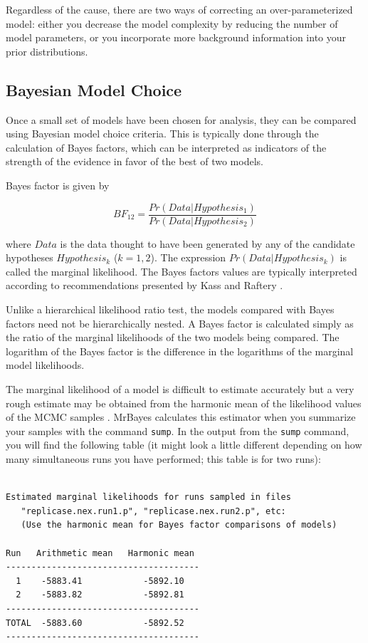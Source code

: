 \documentclass[12pt]{book}
\newcommand{\ttt}[1]{\texttt{#1}}
\begin{document}
Regardless of the cause, there are two ways of correcting an over-parameterized model: either you
decrease the model complexity by reducing the number of model parameters, or you incorporate more
background information into your prior distributions.

\subsection{Bayesian Model Choice}
Once a small set of models have been chosen for analysis, they can be compared using Bayesian model
choice criteria. This is typically done through the calculation of Bayes factors, which can be
interpreted as indicators of the strength of the evidence in favor of the best of two models.

Bayes factor is given by

$$
BF_{12} = \frac{Pr(Data|Hypothesis_{1})}{Pr(Data|Hypothesis_{2})}
$$

where $Data$ is the data thought to have been generated by any of the candidate hypotheses
$Hypothesis_{k}$ ($k = 1,2$). The expression $Pr(Data|Hypothesis_{k})$ is called the marginal
likelihood.  The Bayes factors values are typically interpreted according to recommendations
presented by Kass and Raftery \citep{kass95}.

Unlike a hierarchical likelihood ratio test, the models compared with Bayes factors need not be
hierarchically nested. A Bayes factor is calculated simply as the ratio of the marginal likelihoods
of the two models being compared. The logarithm of the Bayes factor is the difference in the
logarithms of the marginal model likelihoods.

The marginal likelihood of a model is difficult to estimate accurately but a very rough estimate
may be obtained from the harmonic mean of the likelihood values of the MCMC samples
\citep{newton94}. MrBayes calculates this estimator when you summarize your samples with the
command \ttt{sump}. In the output from the \ttt{sump} command, you will find the following table
(it might look a little different depending on how many simultaneous runs you have performed; this
table is for two runs):

\begin{singlespacing}
\footnotesize
\begin{verbatim}

Estimated marginal likelihoods for runs sampled in files
   "replicase.nex.run1.p", "replicase.nex.run2.p", etc:
   (Use the harmonic mean for Bayes factor comparisons of models)

Run   Arithmetic mean   Harmonic mean
--------------------------------------
  1    -5883.41            -5892.10
  2    -5883.82            -5892.81
--------------------------------------
TOTAL  -5883.60            -5892.52
--------------------------------------
\end{verbatim}
\normalsize
\end{singlespacing}
\end{document}
